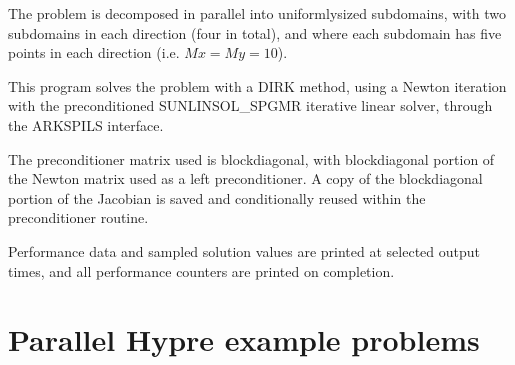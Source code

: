 \documentclass[letterpaper,10pt,english]{sphinxmanual}
\begin{document}
\sphinxAtStartPar
The problem is decomposed in parallel into uniformly\sphinxhyphen{}sized subdomains,
with two subdomains in each direction (four in total), and where each
subdomain has five points in each direction (i.e. \(Mx=My=10\)).

\sphinxAtStartPar
This program solves the problem with a DIRK method, using a Newton
iteration with the preconditioned SUNLINSOL\_SPGMR iterative linear
solver, through the ARKSPILS interface.

\sphinxAtStartPar
The preconditioner matrix used is block\sphinxhyphen{}diagonal, with block\sphinxhyphen{}diagonal
portion of the Newton matrix used as a left preconditioner.  A copy of
the block\sphinxhyphen{}diagonal portion of the Jacobian is saved and conditionally
reused within the preconditioner routine.

\sphinxAtStartPar
Performance data and sampled solution values are printed at
selected output times, and all performance counters are printed
on completion.

\sphinxstepscope


\chapter{Parallel Hypre example problems}
\label{\detokenize{c_parhyp:parallel-hypre-example-problems}}\label{\detokenize{c_parhyp:parhyp-c}}\label{\detokenize{c_parhyp::doc}}
\end{document}
